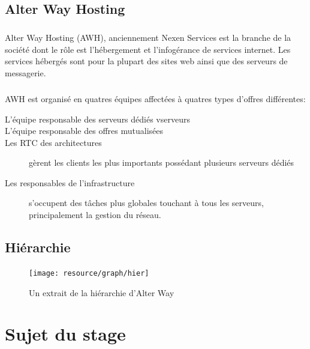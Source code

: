 \section{Alter Way Hosting}
\paragraph*{}
Alter Way Hosting (AWH), anciennement Nexen Services est la branche de la société dont le rôle est l'hébergement et l'infogérance de services internet.
Les services hébergés sont pour la plupart des sites web ainsi que des serveurs de messagerie.

\paragraph*{}
AWH est organisé en quatres équipes affectées à quatres types d'offres différentes:

\begin{description}
	\item[L'équipe responsable des serveurs dédiés vserveurs \footnotemark]
	\item[L'équipe responsable des offres mutualisées
		\footnotemark] 
	\item[Les RTC \footnotemark des architectures] 
		gèrent les clients les plus importants possédant plusieurs serveurs dédiés
	\item[Les responsables de l'infrastructure] s'occupent des tâches plus globales touchant à tous les serveurs,
		principalement la gestion du réseau.

\end{description}


\section{Hiérarchie}

\begin{figure}[H]
	\centering
	\texttt{[image: resource/graph/hier]}
	\caption{Un extrait de la hiérarchie d'Alter Way}
\end{figure}

\chapter{Sujet du stage}


